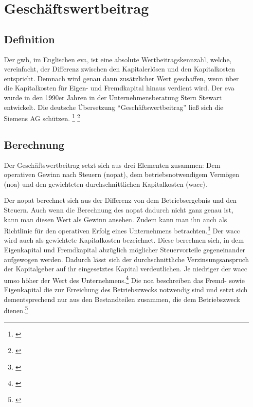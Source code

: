 \chapter{Geschäftswertbeitrag}
\label{Geschaeftswertbeitrag}

\section{Definition}

Der \ac{gwb}, im Englischen \ac{eva}, ist eine absolute Wertbeitragskennzahl, welche, vereinfacht, der Differenz zwischen den Kapitalerlösen und den Kapitalkosten entspricht. Demnach wird genau dann zusätzlicher Wert geschaffen, wenn über die Kapitalkosten für Eigen- und Fremdkapital hinaus verdient wird. Der \ac{eva} wurde in den 1990er Jahren in der Unternehmensberatung Stern Stewart entwickelt. Die deutsche Übersetzung ``Geschäftswertbeitrag'' ließ sich die Siemens AG schützen. \footnote{\cite{wikipedia-eva}} \footnote{\cite{controlling-eva}}

\section{Berechnung}

Der Geschäftswertbeitrag setzt sich aus drei Elementen zusammen: Dem operativen Gewinn nach Steuern (\ac{nopat}), dem betriebsnotwendigem Vermögen (\ac{noa}) und den gewichteten durchschnittlichen Kapitalkosten (\ac{wacc}).

\bigskip
\noindent
Der \ac{nopat} berechnet sich aus der Differenz von dem Betriebsergebnis und den Steuern. Auch wenn die Berechnung des \ac{nopat} dadurch nicht ganz genau ist, kann man diesen Wert als Gewinn ansehen. Zudem kann man ihn auch als Richtlinie für den operativen Erfolg eines Unternehmens betrachten.\footnote{\cite{studyflix-nopat}} Der \ac{wacc} wird auch als gewichtete Kapitalkosten bezeichnet. Diese berechnen sich, in dem Eigenkapital und Fremdkapital abzüglich möglicher Steuervorteile gegeneinander aufgewogen werden. Dadurch lässt sich der durchschnittliche Verzinsungsanspruch der Kapitalgeber auf ihr eingesetztes Kapital verdeutlichen. Je niedriger der \ac{wacc} umso höher der Wert des Unternehmens.\footnote{\cite{studyflix-wacc}} Die \ac{noa} beschreiben das Fremd- sowie Eigenkapital die zur Erreichung des Betriebszwecks notwendig sind und setzt sich dementsprechend nur aus den Bestandteilen zusammen, die dem Betriebszweck dienen.\footnote{\cite{unternehmerinfos-noa}}


